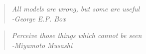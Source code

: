 \begin{quote}
\begin{center}

\emph{
All models are wrong, but some are useful
\\ -George E.P. Box
}
\end{center}
\end{quote}
\medskip
\begin{quote}
\begin{center}
\emph{
Perceive those things which cannot be seen
\\ -Miyamoto Musashi
}
\end{center}
\end{quote}
